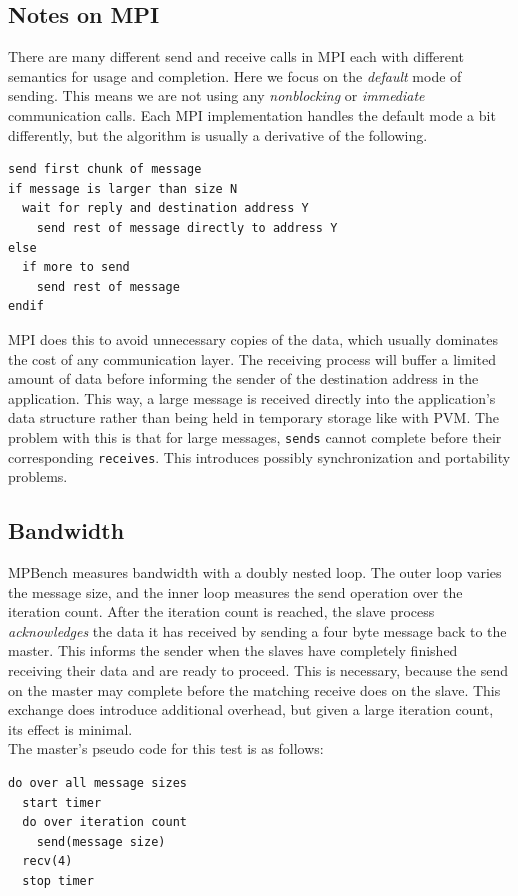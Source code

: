 \documentclass [12pt]{article}
\begin{document}
\subsection{Notes on MPI}
There are many different send and receive calls in MPI each with
different semantics for usage and completion. Here we focus on the
{\em default} mode of sending. This means we are not using any
{\em nonblocking} or {\em immediate} communication calls. Each MPI 
implementation handles the default mode a bit differently, but the
algorithm is usually a derivative of the following. 

\begin{verbatim}
send first chunk of message
if message is larger than size N
  wait for reply and destination address Y
    send rest of message directly to address Y
else
  if more to send
    send rest of message
endif
\end{verbatim}

MPI does this to
avoid unnecessary copies of the data, which usually dominates the
cost of any communication layer. The receiving process will 
buffer a limited amount of data before informing the sender of
the destination address in the application. This way, a large message is
received directly into the application's data structure rather than
being held in temporary storage like with PVM. The problem with this is
that for large messages, {\tt sends} cannot complete before their
corresponding {\tt receives}. This introduces possibly synchronization
and portability problems.

\subsection{Bandwidth}

MPBench measures bandwidth with a doubly nested loop. The outer loop
varies the message size, and the inner loop measures the send operation
over the iteration count. After the iteration count is reached, the
slave process {\em acknowledges} the data it has received by sending a four
byte message back to the master. This informs the sender when the
slaves have completely finished receiving their data and are ready to
proceed. This is necessary, because the send on the master may
complete before the matching receive does on the slave. This exchange
does introduce additional overhead, but given a large iteration count,
its effect is minimal. \\

The master's pseudo code for this test is as follows:
\begin{verbatim}
do over all message sizes
  start timer
  do over iteration count
    send(message size)
  recv(4)
  stop timer
\end{verbatim}
\end{document}
